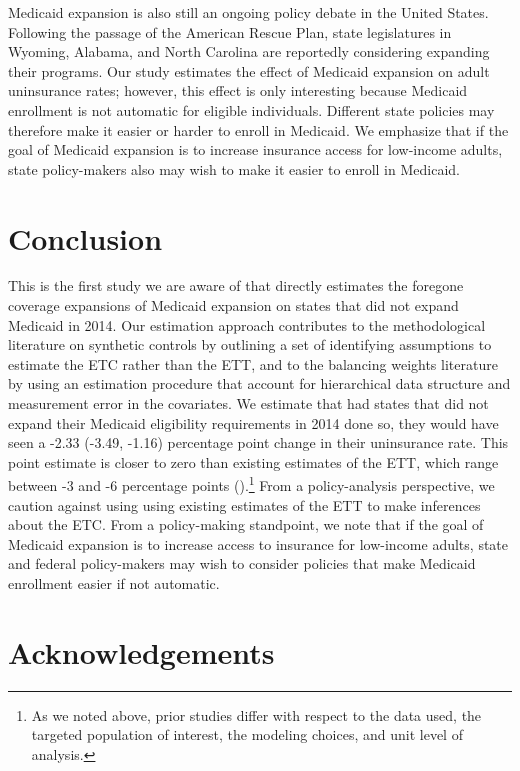 \documentclass[aoas]{imsart}
\theoremstyle{plain}
\theoremstyle{remark}
\begin{document}
Medicaid expansion is also still an ongoing policy debate in the United States. Following the passage of the American Rescue Plan, state legislatures in Wyoming, Alabama, and North Carolina are reportedly considering expanding their programs. Our study estimates the effect of Medicaid expansion on adult uninsurance rates; however, this effect is only interesting because Medicaid enrollment is not automatic for eligible individuals. Different state policies may therefore make it easier or harder to enroll in Medicaid. We emphasize that if the goal of Medicaid expansion is to increase insurance access for low-income adults, state policy-makers also may wish to make it easier to enroll in Medicaid. 

\section{Conclusion}

This is the first study we are aware of that directly estimates the foregone coverage expansions of Medicaid expansion on states that did not expand Medicaid in 2014. Our estimation approach contributes to the methodological literature on synthetic controls by outlining a set of identifying assumptions to estimate the ETC rather than the ETT, and to the balancing weights literature by using an estimation procedure that account for hierarchical data structure and measurement error in the covariates. We estimate that had states that did not expand their Medicaid eligibility requirements in 2014 done so, they would have seen a -2.33 (-3.49, -1.16) percentage point change in their uninsurance rate. This point estimate is closer to zero than existing estimates of the ETT, which range between -3 and -6 percentage points (\cite{frean2017premium}).\footnote{As we noted above, prior studies differ with respect to the data used, the targeted population of interest, the modeling choices, and unit level of analysis.} From a policy-analysis perspective, we caution against using using existing estimates of the ETT to make inferences about the ETC. From a policy-making standpoint, we note that if the goal of Medicaid expansion is to increase access to insurance for low-income adults, state and federal policy-makers may wish to consider policies that make Medicaid enrollment easier if not automatic.

\section*{Acknowledgements}
\end{document}
